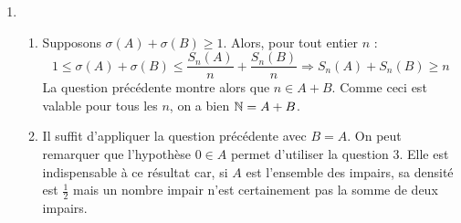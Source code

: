 \begin{enumerate}
\item \begin{enumerate}
  \item Supposons $\sigma (A) +\sigma (B) \geq 1$. Alors, pour tout entier $n$ :
\begin{displaymath}
1\leq \sigma (A) +\sigma (B) \leq \frac{S_n(A)}{n}+\frac{S_n(B)}{n}  \Rightarrow S_n(A)+S_n(B) \geq n
\end{displaymath}
La question précédente montre alors que $n\in A+B$. Comme ceci est valable pour tous les $n$, on a bien $\mathbb{N}=A+B$.

  \item Il suffit d'appliquer la question précédente avec $B=A$.\newline
  On peut remarquer que l'hypothèse $0\in A$ permet d'utiliser la question 3. Elle est indispensable à ce résultat
  car, si $A$ est l'ensemble des impairs, sa densité est $\frac{1}{2}$ mais un nombre impair n'est certainement pas la somme de deux impairs.
\end{enumerate}
\end{enumerate}

